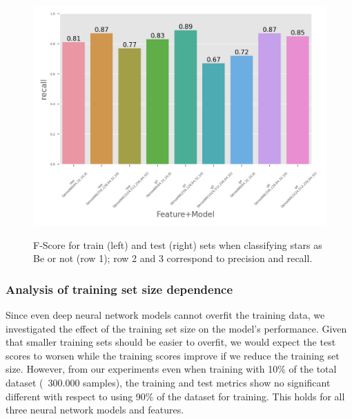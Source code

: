 \documentclass{article}
\begin{document}
\begin{figure}
    \includegraphics[width=0.49\linewidth]{plots/EvaluateClassifiers/aidelman_be_test_recall.png}\\
    \label{fig:aidelman_be}
    \caption{F-Score for train (left) and test (right) sets when classifying stars as Be or not (row 1); row 2 and 3 correspond to precision and recall.}
\end{figure}

\subsubsection{Analysis of training set size dependence}

Since even deep neural network models cannot overfit the training data, we investigated the effect of the training set size on the model's performance. Given that smaller training sets should be easier to overfit, we would expect the test scores to worsen while the training scores improve if we reduce the training set size. However, from our experiments even when training with 10\% of the total dataset (~300.000 samples), the training and test metrics show no significant different with respect to using 90\% of the dataset for training. This holds for all three neural network models and features.
\end{document}
